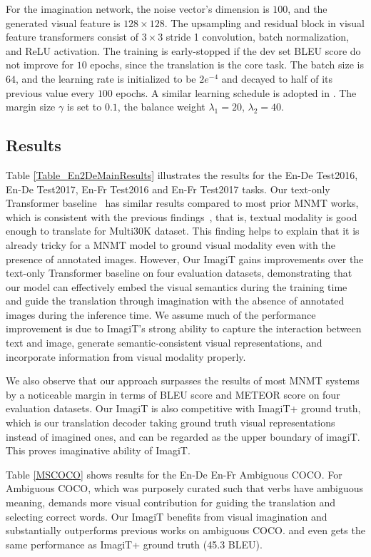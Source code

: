 \documentclass[11pt]{article}
\newcommand{\method}{ImagiT\xspace}
\begin{document}
For the imagination network, the noise vector's dimension is $100$, and the generated visual feature is $128\times128$. The upsampling and residual block in visual feature transformers consist of $3\times3$ stride 1 convolution, batch normalization, and ReLU activation. The training is early-stopped if the dev set BLEU score do not improve for $10$ epochs, since the translation is the core task. The batch size is $64$, and the learning rate is initialized to be $2e^{-4}$ and decayed to half of its previous value every $100$ epochs. A similar learning schedule is adopted in \citet{zhang2017stackgan}. The margin size $\gamma$ is set to $0.1$, the balance weight $\lambda_{1}=20$, $\lambda_{2}=40$. 

\subsection{Results}

Table \ref{Table_En2DeMainResults} illustrates the results for the En-De Test2016, En-De Test2017, En-Fr Test2016 and En-Fr Test2017 tasks. Our text-only Transformer baseline~\cite{vaswani2017attention} has similar results compared to most prior MNMT works, which is consistent with the previous findings~\cite{caglayan2019probing}, that is, textual modality is good enough to translate for Multi30K dataset. This finding helps to explain that it is already tricky for a MNMT model to ground visual modality even with the presence of annotated images. However, Our \method gains improvements over the text-only Transformer baseline on four evaluation datasets, demonstrating that our model can effectively embed the visual semantics during the training time and guide the translation through imagination with the absence of annotated images during the inference time. We assume much of the performance improvement is due to \method's strong ability to capture the interaction between text and image, generate semantic-consistent visual representations, and incorporate information from visual modality properly. 

We also observe that our approach surpasses the results of most MNMT systems by a noticeable margin in terms of BLEU score and METEOR score on four evaluation datasets. Our \method is also competitive with \method + ground truth, which is our translation decoder taking ground truth visual representations instead of imagined ones, and can be regarded as the upper boundary of imagiT. This proves imaginative ability of \method.

Table \ref{MSCOCO} shows results for the En-De En-Fr Ambiguous COCO. For Ambiguous COCO, which was purposely curated such that verbs have ambiguous meaning, demands more visual contribution for guiding the translation and selecting correct words. Our \method benefits from visual imagination and substantially outperforms previous works on ambiguous COCO. and even gets the same performance as \method + ground truth (45.3 BLEU).
\end{document}
